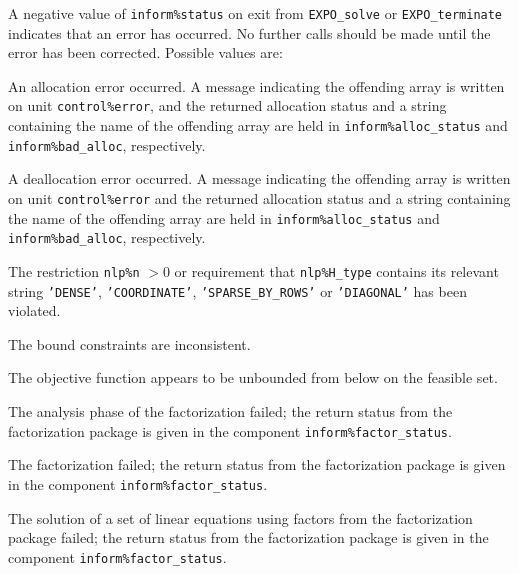 \documentclass{galahad}
\newcommand{\packagename}{EXPO}
\begin{document}

\galerrors
A negative value of {\tt inform\%status} on exit from
{\tt \packagename\_solve}
or
{\tt \packagename\_terminate}
indicates that an error has occurred. No further calls should be made
until the error has been corrected. Possible values are:

\begin{description}

 An allocation error occurred.
A message indicating the offending
array is written on unit {\tt control\%error}, and the returned allocation
status and a string containing the name of the offending array
are held in {\tt inform\%alloc\_\-status}
and {\tt inform\%bad\_alloc}, respectively.

 A deallocation error occurred.
A message indicating the offending
array is written on unit {\tt control\%error} and the returned allocation
status and a string containing the name of the offending array
are held in {\tt inform\%alloc\_\-status}
and {\tt inform\%bad\_alloc}, respectively.

  The restriction {\tt nlp\%n} $> 0$
  or requirement that {\tt nlp\%H\_type} contains its relevant string
  {\tt 'DENSE'}, {\tt 'COORDINATE'}, {\tt 'SPARSE\_BY\_ROWS'}
  or {\tt 'DIAGONAL'}
  has been violated.


 The bound constraints are inconsistent.

  The objective function appears to be unbounded
 from below on the feasible set.

 The analysis phase of the factorization failed;
 the return status from the factorization
    package is given in the component {\tt inform\%fac\-t\-or\_status}.

 The factorization failed;
 the return status from the factorization
    package is given in the component {\tt inform\%fac\-t\-or\_status}.

 The solution of a set of linear equations
 using factors from the factorization package failed;
 the return status from the factorization
    package is given in the component {\tt inform\%fac\-t\-or\_status}.


\end{description}
\end{document}
